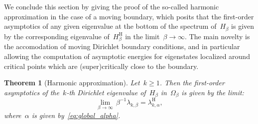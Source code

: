 \documentclass[10pt]{article}
\newcommand{\1}{\mathbbm 1}
\newtheorem{theorem}{Theorem}
\begin{document}
    We conclude this section by giving the proof of the so-called harmonic approximation in the case of a moving boundary, which posits that the first-order asymptotics of any given eigenvalue at the bottom of the spectrum of~$H_\beta$ is given by the corresponding eigenvalue of~$H_\beta^{\mathrm H}$ in the limit~$\beta\to\infty$.
    The main novelty is the accomodation of moving Dirichlet boundary conditions, and in particular allowing the computation of asymptotic energies for eigenstates localized around critical points which are (super)critically close to the boundary.

    \begin{theorem}[Harmonic approximation]
        \label{thm:harm_approx}
        Let~$k\geq 1$. Then the first-order asymptotics of the~$k$-th Dirichlet eigenvalue of~$H_\beta$ in~$\Omega_\beta$ is given by the limit:
        \begin{equation}
            \label{eq:harm_limit}
            \underset{\beta\to\infty}{\lim}\,\beta^{-1}\lambda_{k,\beta} = \lambda_{k,\alpha}^{\mathrm{H}},
        \end{equation}
        where~$\alpha$ is given by~\eqref{eq:global_alpha}.
    \end{theorem}
\end{document}
